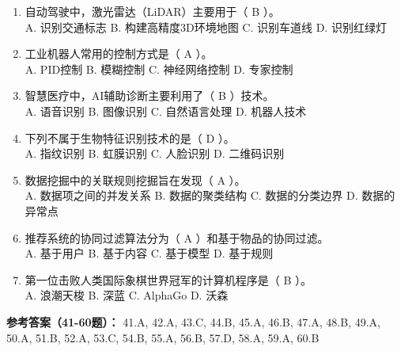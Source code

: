 \begin{enumerate}[resume,leftmargin=2em,itemsep=1pt]
\\ A. 计算速度快 B. 模型精度高 C. 数据隐私保护 D. 通信成本低
\item 自动驾驶中，激光雷达（LiDAR）主要用于（ B ）。
\\ A. 识别交通标志 B. 构建高精度3D环境地图 C. 识别车道线 D. 识别红绿灯
\item 工业机器人常用的控制方式是（ A ）。
\\ A. PID控制 B. 模糊控制 C. 神经网络控制 D. 专家控制
\item 智慧医疗中，AI辅助诊断主要利用了（ B ）技术。
\\ A. 语音识别 B. 图像识别 C. 自然语言处理 D. 机器人技术
\item 下列不属于生物特征识别技术的是（ D ）。
\\ A. 指纹识别 B. 虹膜识别 C. 人脸识别 D. 二维码识别
\item 数据挖掘中的关联规则挖掘旨在发现（ A ）。
\\ A. 数据项之间的并发关系 B. 数据的聚类结构 C. 数据的分类边界 D. 数据的异常点
\item 推荐系统的协同过滤算法分为（ A ）和基于物品的协同过滤。
\\ A. 基于用户 B. 基于内容 C. 基于模型 D. 基于规则
\item 第一位击败人类国际象棋世界冠军的计算机程序是（ B ）。
\\ A. 浪潮天梭 B. 深蓝 C. AlphaGo D. 沃森
\end{enumerate}

\textbf{参考答案（41-60题）：}
41.A, 42.A, 43.C, 44.B, 45.A, 46.B, 47.A, 48.B, 49.A, 50.A, 
51.B, 52.A, 53.C, 54.B, 55.A, 56.B, 57.D, 58.A, 59.A, 60.B


